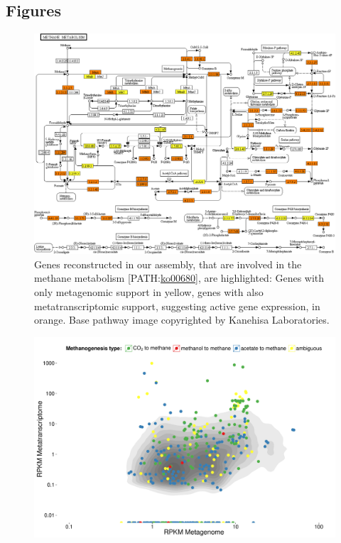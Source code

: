 \documentclass{bmcart}
\begin{document}
\begin{backmatter}


\newpage
\section*{Figures}
\begin{figure}[h!]
\centering
\includegraphics[width=.9\textwidth]{map00680_cropped}
\caption{ Genes reconstructed in our assembly, that are involved in the methane metabolism [PATH:\href{http://www.genome.jp/kegg-bin/show_pathway?ko00680}{ko00680}], are highlighted: Genes with only metagenomic support in yellow, genes with also metatranscriptomic support, suggesting active gene expression, in orange.
Base pathway image copyrighted by Kanehisa Laboratories.}
\label{fPathway}
\end{figure}
\begin{figure}[h!]
\centering
\includegraphics[width=.9\textwidth]{Rplot}

\end{figure}
\end{backmatter}
\end{document}
